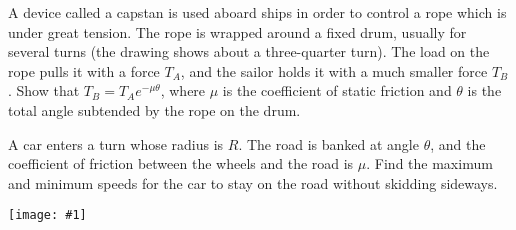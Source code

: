 \documentclass[12pt,letterpaper]{hmcpset}
\newcommand{\diagram}[1]{\begin{center}\texttt{[image: \#1]}\end{center}}
\begin{document}
\begin{problem}[2 - Capstan - KK 3.12]
    A device called a capstan is used
    aboard ships in order to control a rope
    which is under great tension. The rope
    is wrapped around a fixed drum, usually
    for several turns (the drawing shows 
    about a three-quarter turn). The load on
    the rope pulls it with a force $T_{A}$, 
    and the sailor holds it with a much smaller
    force $T_{B}$. Show that $T_{B} = T_{A}e^{-\mu\theta}$,
    where $\mu$ is the coefficient of static friction
    and $\theta$ is the total angle subtended
    by the rope on the drum.

    \begin{center}
    \end{center}
\end{problem}

\begin{solution}
    \vfill
\end{solution}
\newpage

\begin{problem}
    A car enters a turn whose radius is $R$.
    The road is banked at angle $\theta$, and
    the coefficient of friction between the
    wheels and the road is $\mu$. Find the 
    maximum and minimum speeds for the car to 
    stay on the road without skidding sideways.

    \diagram{img/3_17.png}
\end{problem}
\end{document}
